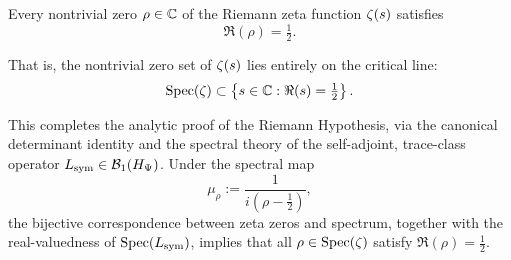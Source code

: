 \begin{theorem}
\label{thm:truth_of_rh}

Every nontrivial zero \( \rho \in \mathbb{C} \) of the Riemann zeta function \( \zeta(s) \) satisfies
\[
\Re(\rho) = \tfrac{1}{2}.
\]

\medskip

\noindent
That is, the nontrivial zero set of \( \zeta(s) \) lies entirely on the critical line:
\[
\operatorname{Spec}(\zeta) \subset \left\{ s \in \mathbb{C} : \Re(s) = \tfrac{1}{2} \right\}.
\]

\medskip

\noindent
This completes the analytic proof of the Riemann Hypothesis, via the canonical determinant identity and the spectral theory of the self-adjoint, trace-class operator \( L_{\mathrm{sym}} \in \mathcal{B}_1(H_{\Psi}) \). Under the spectral map
\[
\mu_\rho := \frac{1}{i(\rho - \tfrac{1}{2})},
\]
the bijective correspondence between zeta zeros and spectrum, together with the real-valuedness of \( \operatorname{Spec}(L_{\mathrm{sym}}) \), implies that all \( \rho \in \operatorname{Spec}(\zeta) \) satisfy \( \Re(\rho) = \tfrac{1}{2} \).
\end{theorem}
